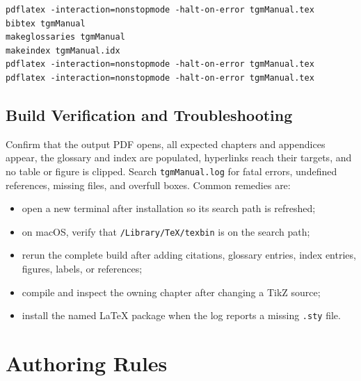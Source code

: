 \begin{verbatim}
pdflatex -interaction=nonstopmode -halt-on-error tgmManual.tex
bibtex tgmManual
makeglossaries tgmManual
makeindex tgmManual.idx
pdflatex -interaction=nonstopmode -halt-on-error tgmManual.tex
pdflatex -interaction=nonstopmode -halt-on-error tgmManual.tex
\end{verbatim}

\subsection{Build Verification and Troubleshooting}

Confirm that the output PDF opens, all expected chapters and appendices appear,
the glossary and index are populated, hyperlinks reach their targets, and no
table or figure is clipped. Search \texttt{tgmManual.log} for fatal errors,
undefined references, missing files, and overfull boxes. Common remedies are:

\begin{itemize}
\item open a new terminal after installation so its search path is refreshed;
\item on macOS, verify that \texttt{/Library/TeX/texbin} is on the search path;
\item rerun the complete build after adding citations, glossary entries, index
entries, figures, labels, or references;
\item compile and inspect the owning chapter after changing a TikZ source;
\item install the named LaTeX package when the log reports a missing
\texttt{.sty} file.
\end{itemize}

\section{Authoring Rules}

